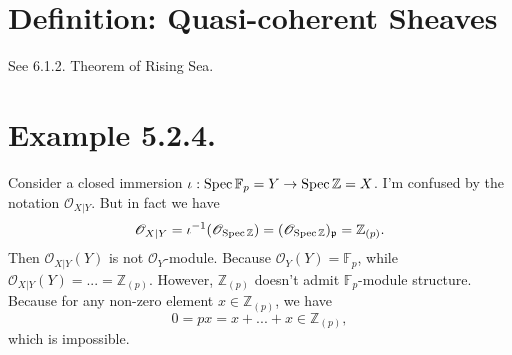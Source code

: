 \section{Definition: Quasi-coherent Sheaves}

See 6.1.2. Theorem of Rising Sea. 

\section{Example 5.2.4.}

Consider a closed immersion $\iota:\operatorname{Spec} \mathbb F_{p}=Y\to \operatorname{Spec} \mathbb Z=X$. I'm confused by the notation $\mathscr O_{X\vert Y}$. But in fact we have 
\[\mathscr O_{X\vert Y}=\iota^{-1}(\mathscr O_{\operatorname{Spec} \mathbb Z})=(\mathscr O_{\operatorname{Spec} \mathbb Z})_{\mathfrak p}=\mathbb Z_{(p)}.\]
Then $\mathscr O_{X\vert Y}(Y)$ is not $\mathscr O_Y$-module. Because $\mathscr O_Y(Y)=\mathbb F_{p}$, while $\mathscr O_{X\vert Y}(Y)=...=\mathbb Z_{(p)}$. 
However, $\mathbb Z_{(p)}$ doesn't admit $\mathbb F_p$-module structure. Because for any non-zero element $x\in \mathbb Z_{(p)}$, we have 
$$0= px = x+...+x\in\mathbb Z_{(p)}, $$ which is impossible.